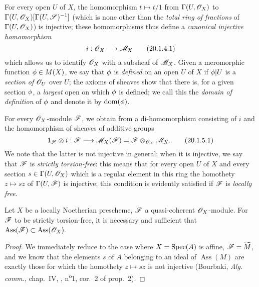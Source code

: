 \begin{env}[20.1.4]
\label{IV.20.1.4}
For every open $U$ of $X$, the homomorphism $t\mapsto t/1$ from $\Gamma(U,\mathscr{O}_X)$ to $\Gamma(U,\mathscr{O}_X)[\Gamma(U,\mathscr{S})^{-1}]$ (which is none other than the \emph{total ring of fractions} of
$\Gamma(U,\mathscr{O}_X)$) is injective;
these homomorphisms thus define a \emph{canonical injective homomorphism}
\[
\label{IV.20.1.4.1}
  i:\sh{O}_X\to\sh{M}_X
  \tag{20.1.4.1}
\]
which allows us to identify $\mathscr{O}_X$ with a subsheaf of $\mathscr{M}_X$.
Given a meromorphic function $\phi\in M(X)$, we say that $\phi$ is \emph{defined} on an open $U$ of $X$ if $\phi|U$ is a \emph{section of $\mathscr{O}_U$} over $U$;
the axioms of sheaves show that there is, for a given section $\phi$, a \emph{largest} open on which $\phi$ is defined;
we call this the \emph{domain of definition} of $\phi$ and denote it by $\operatorname{dom}(\phi)$.
\end{env}

\begin{env}[20.1.5]
\label{IV.20.1.5}
For every $\mathscr{O}_X$-module $\mathscr{F}$, we obtain from  a di-homomorphism consisting of $i$ and the homomorphism of sheaves of additive groups
\[
\label{IV.20.1.5.1}
  1_\sh{F}\otimes i:\sh{F}\to\sh{M}_X(\sh{F})=\sh{F}\otimes_{\sh{O}_X}\sh{M}_X.
  \tag{20.1.5.1}
\]
We note that the latter is not injective in general;
when it is injective, we say that $\mathscr{F}$ is \emph{strictly torsion-free}:
this means that for every open $U$ of $X$ and every section $s\in\Gamma(U,\mathscr{O}_X)$ which is a regular element in this ring the homothety $z\mapsto sz$ of $\Gamma(U,\mathscr{F})$ is injective;
this condition is evidently satisfied if $\mathscr{F}$ is \emph{locally free}.
\end{env}

\begin{proposition}[20.1.6]
\label{IV.20.1.6}
Let $X$ be a locally Noetherian prescheme, $\mathscr{F}$ a quasi-coherent $\mathscr{O}_X$-module.
For $\mathscr{F}$ to be strictly torsion-free, it is necessary and sufficient that $\operatorname{Ass}(\mathscr{F})\subset\operatorname{Ass}(\mathscr{O}_X)$.
\end{proposition}
 
\begin{proof}
We immediately reduce to the case where $X=\operatorname{Spec}(A)$ is affine, $\mathscr{F}=\widetilde{M}$, and we know that the elements $s$ of $A$ belonging to an ideal of $\operatorname{Ass}(M)$ are exactly those for which the homothety $z\mapsto sz$ is not injective (Bourbaki, \emph{Alg. comm.}, chap.~IV, , n\textsuperscript{o}1, cor.~2 of prop.~2).
\end{proof}

